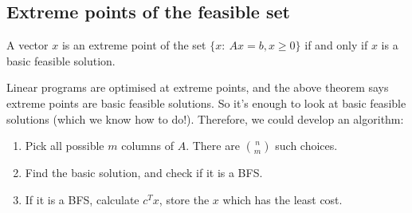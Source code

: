 \documentclass[a4paper]{scrartcl}
\begin{document}
\subsection{Extreme points of the feasible set}
\begin{theorem}
	 A vector $x$ is an extreme point of the set $\{x: \ Ax=b, x \geq 0\}$ if and only if $x$ is a basic feasible solution.
\end{theorem}
\begin{remark}
	 Linear programs are optimised at extreme points, and the above theorem says extreme points are basic feasible solutions. So it's enough to look at basic feasible solutions (which we know how to do!). Therefore, we could develop an algorithm:
	 \begin{enumerate}
		 \item Pick all possible $m$ columns of $A$. There are $n \choose m $ such choices.
		 \item Find the basic solution, and check if it is a BFS.
		 \item If it is a BFS, calculate $c^Tx$, store the $x$ which has the least cost.
	 \end{enumerate}
\end{remark}
\end{document}
